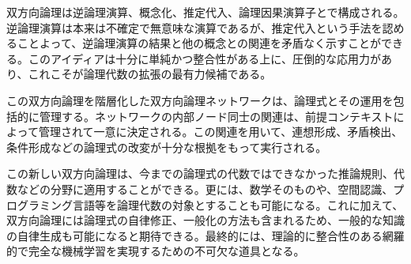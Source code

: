 \documentclass[12pt]{article}
\begin{document}
双方向論理は逆論理演算、概念化、推定代入、論理因果演算子とで構成される。逆論理演算は本来は不確定で無意味な演算であるが、推定代入という手法を認めることよって、逆論理演算の結果と他の概念との関連を矛盾なく示すことができる。このアイディアは十分に単純かつ整合性がある上に、圧倒的な応用力があり、これこそが論理代数の拡張の最有力候補である。

この双方向論理を階層化した双方向論理ネットワークは、論理式とその運用を包括的に管理する。ネットワークの内部ノード同士の関連は、前提コンテキストによって管理されて一意に決定される。この関連を用いて、連想形成、矛盾検出、条件形成などの論理式の改変が十分な根拠をもって実行される。

この新しい双方向論理は、今までの論理式の代数ではできなかった推論規則、代数などの分野に適用することができる。更には、数学そのものや、空間認識、プログラミング言語等を論理代数の対象とすることも可能になる。これに加えて、双方向論理には論理式の自律修正、一般化の方法も含まれるため、一般的な知識の自律生成も可能になると期待できる。最終的には、理論的に整合性のある網羅的で完全な機械学習を実現するための不可欠な道具となる。
\end{document}
